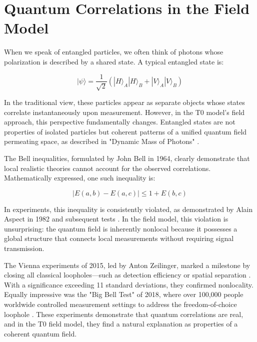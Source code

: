 \documentclass[a4paper,12pt]{article}
\theoremstyle{definition}
\theoremstyle{remark}
\begin{document}
	\section{Quantum Correlations in the Field Model}
	
	When we speak of entangled particles, we often think of photons whose polarization is described by a shared state. A typical entangled state is:
	
	\begin{equation}
		|\psi\rangle = \frac{1}{\sqrt{2}} (|H\rangle_A |H\rangle_B + |V\rangle_A |V\rangle_B)
	\end{equation}
	
	In the traditional view, these particles appear as separate objects whose states correlate instantaneously upon measurement. However, in the T0 model's field approach, this perspective fundamentally changes. Entangled states are not properties of isolated particles but coherent patterns of a unified quantum field permeating space, as described in "Dynamic Mass of Photons" \cite{pascher_photons_2025}.
	
	The Bell inequalities, formulated by John Bell in 1964, clearly demonstrate that local realistic theories cannot account for the observed correlations. Mathematically expressed, one such inequality is:
	
	\begin{equation}
		|E(a,b) - E(a,c)| \leq 1 + E(b,c)
	\end{equation}
	
	In experiments, this inequality is consistently violated, as demonstrated by Alain Aspect in 1982 and subsequent tests \cite{Aspect1982}. In the field model, this violation is unsurprising: the quantum field is inherently nonlocal because it possesses a global structure that connects local measurements without requiring signal transmission.
	
	The Vienna experiments of 2015, led by Anton Zeilinger, marked a milestone by closing all classical loopholes—such as detection efficiency or spatial separation \cite{Giustina2015}. With a significance exceeding 11 standard deviations, they confirmed nonlocality. Equally impressive was the "Big Bell Test" of 2018, where over 100,000 people worldwide controlled measurement settings to address the freedom-of-choice loophole \cite{BigBellTest2018}. These experiments demonstrate that quantum correlations are real, and in the T0 field model, they find a natural explanation as properties of a coherent quantum field.
	
\end{document}

